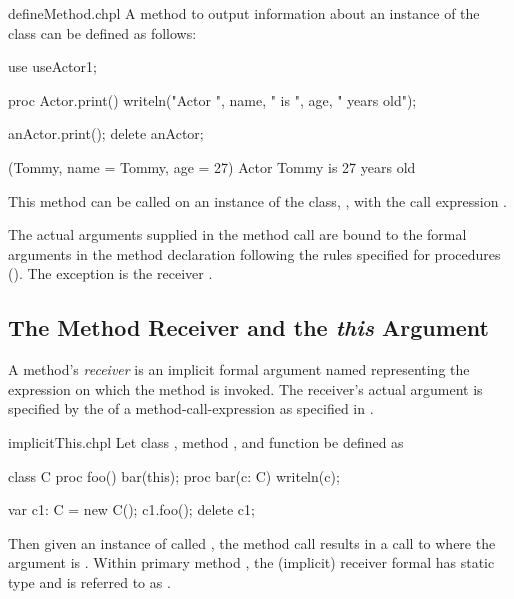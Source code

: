\begin{chapelexample}{defineMethod.chpl}
A method to output information about an instance of the 
class can be defined as follows:
\begin{chapelpre}
use useActor1;
\end{chapelpre}
\begin{chapel}
proc Actor.print() {
  writeln("Actor ", name, " is ", age, " years old");
}
\end{chapel}
\begin{chapelpost}
anActor.print();
delete anActor;
\end{chapelpost}
\begin{chapeloutput}
(Tommy, {name = Tommy, age = 27})
Actor Tommy is 27 years old
\end{chapeloutput}
This method can be called on an instance of the 
class, , with the call expression .
\end{chapelexample}

The actual arguments supplied in the method call are bound to the
formal arguments in the method declaration following the rules specified for
procedures (). The exception is the receiver
.

\subsection{The Method Receiver and the {\em this} Argument}
\label{The_em_this_Reference}

A method's \emph{receiver} is an implicit formal argument
named  representing the expression on which the method is
invoked.  The receiver's actual argument is specified by the
 of a method-call-expression as specified
in .  




\begin{chapelexample}{implicitThis.chpl}
Let class , method , and function  be
defined as
\begin{chapel}
class C {
  proc foo() {
    bar(this);
  }
}
proc bar(c: C) { writeln(c); }
\end{chapel}
\begin{chapelpost}
var c1: C = new C();
c1.foo();
delete c1;
\end{chapelpost}
\begin{chapeloutput}
{}
\end{chapeloutput}
Then given an instance of  called , the method
call  results in a call to  where the
argument is .  Within primary method , the
(implicit) receiver formal has static type  and is referred to
as .
\end{chapelexample}

